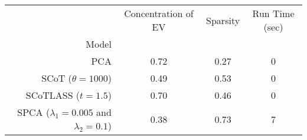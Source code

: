 \begin{tabular}{r|ccc}
\toprule
{} &  Concentration of EV &  Sparsity & Run Time (sec) \\
Model                                        &                      &           &                \\
\midrule
PCA                                          &                 0.72 &      0.27 &              0 \\
SCoT ($\theta = 1000$)                       &                 0.49 &      0.53 &              0 \\
SCoTLASS ($t = 1.5$)                         &                 0.70 &      0.46 &              0 \\
SPCA ($\lambda_1=0.005$ and $\lambda_2=0.1$) &                 0.38 &      0.73 &              7 \\
\bottomrule
\end{tabular}
